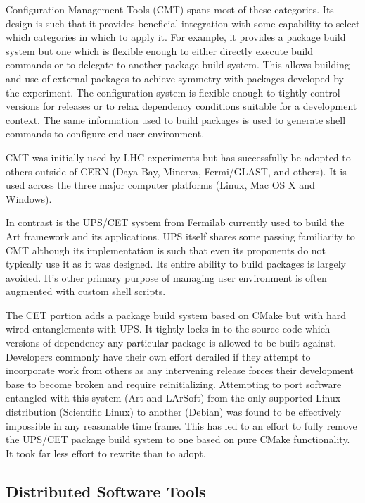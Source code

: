 Configuration Management Tools (CMT) spans most of these categories.
Its design is such that it provides beneficial integration with some
capability to select which categories in which to apply it.  For
example, it provides a package build system but one which is flexible
enough to either directly execute build commands or to delegate to
another package build system.  This allows building and use of
external packages to achieve symmetry with packages developed by the
experiment.  The configuration system is flexible enough to tightly
control versions for releases or to relax dependency conditions
suitable for a development context.  The same information used to
build packages is used to generate shell commands to configure
end-user environment.

CMT was initially used by LHC experiments but has successfully be
adopted to others outside of CERN (Daya Bay, Minerva, Fermi/GLAST, and
others).  It is used across the three major computer platforms (Linux,
Mac OS X and Windows).

In contrast is the UPS/CET system from Fermilab currently used to
build the Art framework and its applications.  UPS itself shares some
passing familiarity to CMT although its implementation is such that
even its proponents do not typically use it as it was designed.  Its
entire ability to build packages is largely avoided.  It's other
primary purpose of managing user environment is often augmented with
custom shell scripts.  

The CET portion adds a package build system based on CMake but with
hard wired entanglements with UPS.  It tightly locks in to the source
code which versions of dependency any particular package is allowed to
be built against.  Developers commonly have their own effort derailed
if they attempt to incorporate work from others as any intervening
release forces their development base to become broken and require
reinitializing.  Attempting to port software entangled with this
system (Art and LArSoft) from the only supported Linux distribution
(Scientific Linux) to another (Debian) was found to be effectively
impossible in any reasonable time frame.  This has led to an effort to
fully remove the UPS/CET package build system to one based on pure
CMake functionality.  It took far less effort to rewrite than to
adopt.

\subsection{Distributed Software Tools}

